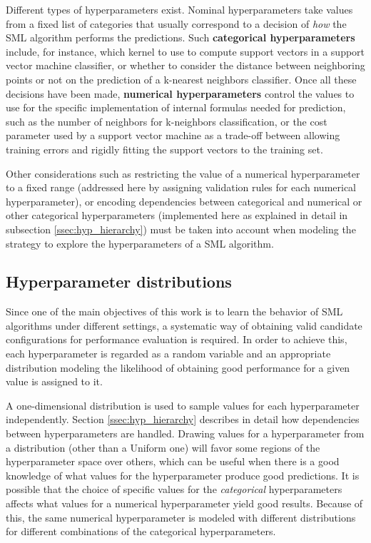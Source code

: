	Different types of hyperparameters exist. Nominal hyperparameters take values from a fixed
	list of categories that usually correspond to a decision of \emph{how} the SML algorithm
	performs the predictions. Such {\bf categorical hyperparameters} include, for instance, which
	kernel to use to compute support vectors in a support vector machine classifier, or whether to
	consider the distance between neighboring points or not on the prediction of a k-nearest
	neighbors classifier. Once all these decisions have been made, {\bf numerical hyperparameters}
	control the values to use for the specific implementation of internal formulas needed for
	prediction, such as the number of neighbors for k-neighbors classification, or the cost
	parameter used by a support vector machine as a trade-off between allowing training errors and
	rigidly fitting the support vectors to the training set.

	Other considerations such as restricting the value of a numerical hyperparameter to a fixed
	range (addressed here by assigning validation rules for each numerical hyperparameter), or
	encoding dependencies between categorical and numerical or other categorical hyperparameters
	(implemented here as explained in detail in subsection \ref{ssec:hyp_hierarchy}) must be taken
	into account when modeling the strategy to explore the hyperparameters of a SML algorithm.

	\subsection{Hyperparameter distributions}
	\label{ssec:hyperparam_dist}
	Since one of the main objectives of this work is to learn the behavior of SML algorithms under
	different settings, a systematic way of obtaining valid candidate configurations for performance
	evaluation is required. In order to achieve this, each hyperparameter is regarded as a random
	variable and an appropriate distribution modeling the likelihood of obtaining good performance
	for a given value is assigned to it.

	A one-dimensional distribution is used to sample values for each hyperparameter
	independently. Section \ref{ssec:hyp_hierarchy} describes in detail how dependencies between
	hyperparameters are handled. Drawing values for a hyperparameter from a distribution (other than
	a Uniform one) will favor some regions of the hyperparameter space over others, which can be
	useful when there is a good knowledge of what values for the hyperparameter produce good
	predictions.  It is possible that the choice of specific values for the \emph{categorical}
	hyperparameters affects what values for a numerical hyperparameter yield good results. Because
	of this, the same numerical hyperparameter is modeled with different distributions for different
	combinations of the categorical hyperparameters.

